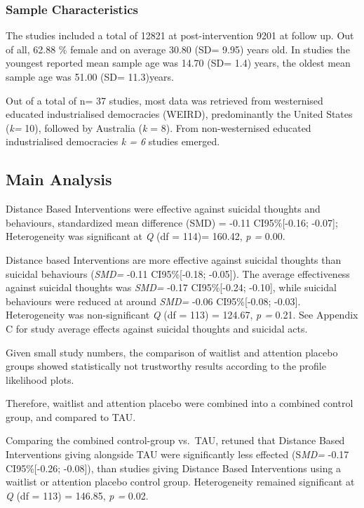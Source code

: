\documentclass[
  english,
  man]{apa6}
\begin{document}
\hypertarget{sample-characteristics}{%
\subsubsection{Sample Characteristics}\label{sample-characteristics}}

The studies included a total of 12821 at post-intervention 9201 at follow up. Out of all, 62.88 \% female and on average 30.80 (SD= 9.95) years old. In studies the youngest reported mean sample age was 14.70 (SD= 1.4) years, the oldest mean sample age was 51.00 (SD= 11.3)years.

Out of a total of n= 37 studies, most data was retrieved from westernised educated industrialised democracies (WEIRD), predominantly the United States (\emph{k=} 10), followed by Australia (\emph{k} = 8). From non-westernised educated industrialised democracies \emph{k = 6} studies emerged.

\hypertarget{main-analysis}{%
\subsection{Main Analysis}\label{main-analysis}}

Distance Based Interventions were effective against suicidal thoughts and behaviours, standardized mean difference (SMD) = -0.11 CI95\%{[}-0.16; -0.07{]}; Heterogeneity was significant at \emph{Q} (df = 114)= 160.42, \emph{p =} 0.00.

Distance based Interventions are more effective against suicidal thoughts than suicidal behaviours (\emph{SMD=} -0.11 CI95\%{[}-0.18; -0.05{]}). The average effectiveness against suicidal thoughts was \emph{SMD=} -0.17 CI95\%{[}-0.24; -0.10{]}, while suicidal behaviours were reduced at around \emph{SMD=} -0.06 CI95\%{[}-0.08; -0.03{]}. Heterogeneity was non-significant \emph{Q} (df = 113) = 124.67, \emph{p =} 0.21. See Appendix C for study average effects against suicidal thoughts and suicidal acts.

Given small study numbers, the comparison of waitlist and attention placebo groups showed statistically not trustworthy results according to the profile likelihood plots.

Therefore, waitlist and attention placebo were combined into a combined control group, and compared to TAU.

Comparing the combined control-group vs.~TAU, retuned that Distance Based Interventions giving alongside TAU were significantly less effected (S\emph{MD=} -0.17 CI95\%{[}-0.26; -0.08{]}), than studies giving Distance Based Interventions using a waitlist or attention placebo control group. Heterogeneity remained significant at \emph{Q} (df = 113) = 146.85, \emph{p =} 0.02.
\end{document}
